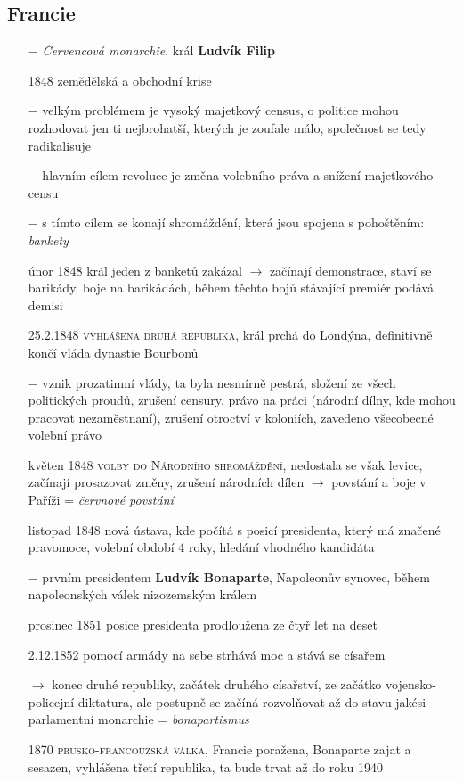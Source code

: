 \documentclass{article}
\begin{document}
\subsection*{Francie}
\begin{itemize}
    \vspace{-0.5em}
    \setlength\itemsep{0.15em}
    \item[$-$] \textit{Červencová monarchie}, král \textbf{Ludvík Filip}
    \item[1848] zemědělská a obchodní krise
    \item[$-$] velkým problémem je vysoký majetkový census, o politice mohou rozhodovat jen ti nejbrohatší, kterých je zoufale málo, společnost se tedy radikalisuje
    \item[$-$] hlavním cílem revoluce je změna volebního práva a snížení majetkového censu
    \item[$-$] s tímto cílem se konají shromáždění, která jsou spojena s pohoštěním: \textit{bankety}
    \item[únor 1848] král jeden z banketů zakázal $\rightarrow$ začínají demonstrace, staví se barikády, boje na barikádách, během těchto bojů stávající premiér podává demisi
    \item[25.2.1848] \textsc{vyhlášena druhá republika}, král prchá do Londýna, definitivně končí vláda dynastie Bourbonů
    \item[$-$] vznik prozatimní vlády, ta byla nesmírně pestrá, složení ze všech politických proudů, zrušení censury, právo na práci (národní dílny, kde mohou pracovat nezaměstnaní), zrušení otroctví v koloniích, zavedeno všecobecné volební právo
    \item[květen 1848] \textsc{volby do Národního shromáždění}, nedostala se však levice, začínají prosazovat změny, zrušení národních dílen $\rightarrow$ povstání a boje v Paříži = \textit{červnové povstání}
    \item[listopad 1848] nová ústava, kde počítá s posicí presidenta, který má značené pravomoce, volební období 4 roky, hledání vhodného kandidáta
    \item[$-$] prvním presidentem \textbf{Ludvík Bonaparte}, Napoleonův synovec, během napoleonských válek nizozemským králem
    \item[prosinec 1851] posice presidenta prodloužena ze čtyř let na deset
    \item[2.12.1852] pomocí armády na sebe strhává moc a stává se císařem
    \item[$\rightarrow$] konec druhé republiky, začátek druhého císařství, ze začátko vojensko-policejní diktatura, ale postupně se začíná rozvolňovat až do stavu jakési parlamentní monarchie = \textit{bonapartismus}
    \item[1870] \textsc{prusko-francouzská válka}, Francie poražena, Bonaparte zajat a sesazen, vyhlášena třetí republika, ta bude trvat až do roku 1940
\end{itemize}
\end{document}
